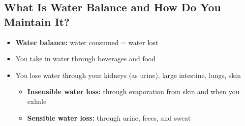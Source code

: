 \documentclass[12pt]{article}
\begin{document}
        \subsection{What Is Water Balance and How Do You Maintain It?}
            \begin{itemize}
                \item \textbf{Water balance:} water consumed = water lost
                \item You take in water through beverages and food
                \item You lose water through your kidneys (as urine), large intestine, lungs, skin
                    \begin{itemize}
                        \item \textbf{Insensible water loss:} through evaporation from skin and when you exhale
                        \item \textbf{Sensible water loss:} through urine, feces, and sweat
                    \end{itemize}
            \end{itemize}
\end{document}
